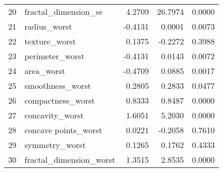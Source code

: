 \begin{table}[!h]
\begin{tabular}{r l r r r}
        20 & fractal\_dimension\_se    & 4.2709 & 26.7974 & 0.0000 \\
        21 & radius\_worst             & -0.4131 & 0.0001 & 0.0073 \\
        22 & texture\_worst            & 0.1375 & -0.2272 & 0.3988 \\
        23 & perimeter\_worst          & -0.4131 & 0.0143 & 0.0072 \\
        24 & area\_worst               & -0.4709 & 0.0885 & 0.0017 \\
        25 & smoothness\_worst         & 0.2805 & 0.2833 & 0.0477 \\
        26 & compactness\_worst        & 0.8333 & 0.8487 & 0.0000 \\
        27 & concavity\_worst          & 1.6051 & 5.2030 & 0.0000 \\
        28 & concave points\_worst     & 0.0221 & -0.2058 & 0.7610 \\
        29 & symmetry\_worst           & 0.1265 & 0.1762 & 0.4333 \\
        30 & fractal\_dimension\_worst & 1.3515 & 2.8535 & 0.0000 \\
        \bottomrule
    \end{tabular}
\end{table}




